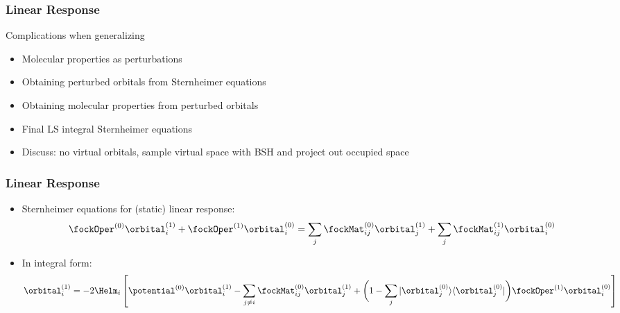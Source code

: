 \begin{frame}
  \frametitle{Linear Response}
  Complications when generalizing
  \begin{itemize}
    \item Molecular properties as perturbations
    \item Obtaining perturbed orbitals from Sternheimer equations
    \item Obtaining molecular properties from perturbed orbitals
    \item Final LS integral Sternheimer equations
    \item Discuss: no virtual orbitals, sample virtual space with BSH and project out occupied space
  \end{itemize}
\end{frame}

\begin{frame}
  \frametitle{Linear Response}
  \begin{itemize}
    \item Sternheimer equations for (static) linear response:
      \begin{equation}
        \fockOper^{(0)}\orbital_i^{(1)} + \fockOper^{(1)}\orbital_i^{(0)} =
        \sum_j \fockMat_{ij}^{(0)}\orbital_j^{(1)} + \sum_j \fockMat_{ij}^{(1)}\orbital_i^{(0)}
      \end{equation}
    \item In integral form:
      \begin{equation}
        \orbital_i^{(1)} = -2\Helm_i\left[\potential^{(0)} \orbital_i^{(1)}
                           - \sum_{j \neq i} \fockMat_{ij}^{(0)} \orbital_j^{(1)}
                           + \bigg(1 - \sum_j |\orbital_j^{(0)}\rangle\langle\orbital_j^{(0)}|\bigg) \fockOper^{(1)} \orbital_i^{(0)}
                           \right]
      \end{equation}
  \end{itemize}
\end{frame}

